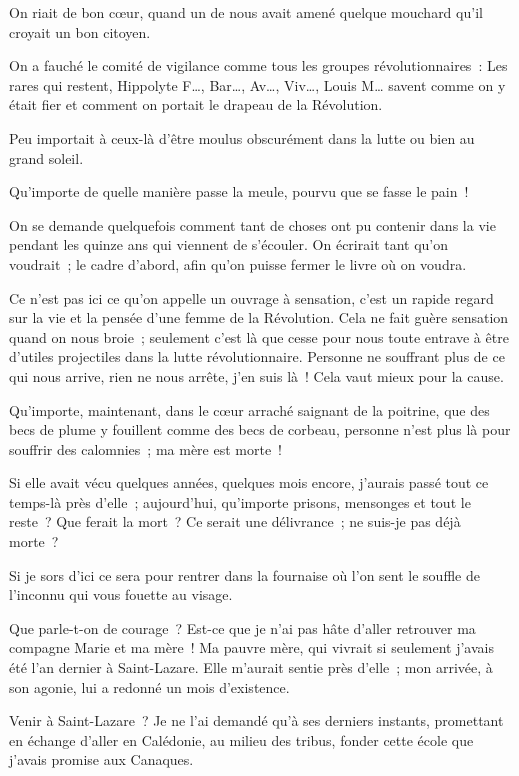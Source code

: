 \documentclass[french,twoside]{book} %
\begin{document}
On riait de bon cœur, quand un de nous avait amené quelque mouchard qu’il croyait un bon citoyen.\par
On a fauché le comité de vigilance comme tous les groupes révolutionnaires : Les rares qui restent, Hippolyte F…, Bar…, Av…, Viv…, Louis M… savent comme on y était fier et comment on portait le drapeau de la Révolution.\par
Peu importait à ceux-là d’être moulus obscurément dans la lutte ou bien au grand soleil.\par
Qu’importe de quelle manière passe la meule, pourvu que se fasse le pain !\par
\bigbreak
\noindent On se demande quelquefois comment tant de choses ont pu contenir dans la vie pendant les quinze ans qui viennent de s’écouler. On écrirait  tant qu’on voudrait ; le cadre d’abord, afin qu’on puisse fermer le livre où on voudra.\par
Ce n’est pas ici ce qu’on appelle un ouvrage à sensation, c’est un rapide regard sur la vie et la pensée d’une femme de la Révolution. Cela ne fait guère sensation quand on nous broie ; seulement c’est là que cesse pour nous toute entrave à être d’utiles projectiles dans la lutte révolutionnaire. Personne ne souffrant plus de ce qui nous arrive, rien ne nous arrête, j’en suis là ! Cela vaut mieux pour la cause.\par
Qu’importe, maintenant, dans le cœur arraché saignant de la poitrine, que des becs de plume y fouillent comme des becs de corbeau, personne n’est plus là pour souffrir des calomnies ; ma mère est morte !\par
Si elle avait vécu quelques années, quelques mois encore, j’aurais passé tout ce temps-là près d’elle ; aujourd’hui, qu’importe prisons, mensonges et tout le reste ? Que ferait la mort ? Ce serait une délivrance ; ne suis-je pas déjà morte ?\par
Si je sors d’ici ce sera pour rentrer dans la fournaise où l’on sent le souffle de l’inconnu qui vous fouette au visage.\par
Que parle-t-on de courage ? Est-ce que je n’ai pas hâte d’aller retrouver ma compagne Marie et ma mère ! Ma pauvre mère, qui vivrait si seulement  j’avais été l’an dernier à Saint-Lazare. Elle m’aurait sentie près d’elle ; mon arrivée, à son agonie, lui a redonné un mois d’existence.\par
Venir à Saint-Lazare ? Je ne l’ai demandé qu’à ses derniers instants, promettant en échange d’aller en Calédonie, au milieu des tribus, fonder cette école que j’avais promise aux Canaques.\par
\end{document}
